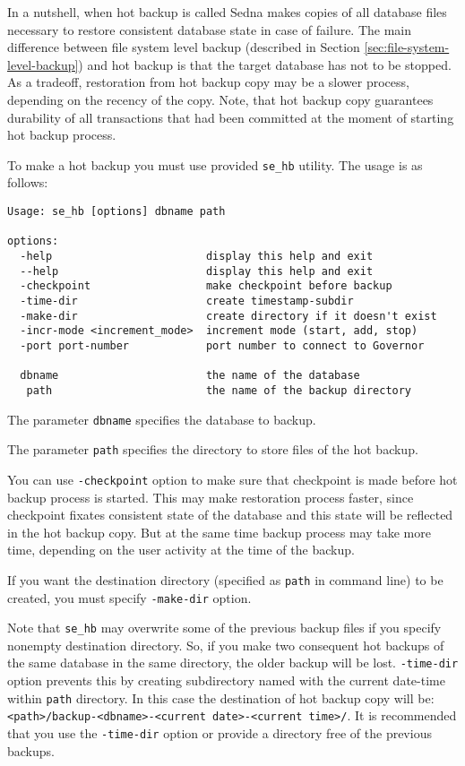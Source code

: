 \documentclass[a4paper,12pt]{article}
\begin{document}
In a nutshell, when hot backup is called Sedna makes copies of all database
files necessary to restore consistent database state in case of failure. The
main difference between file system level backup (described in Section
\ref{sec:file-system-level-backup}) and hot backup is that the target database
has not to be stopped. As a tradeoff, restoration from hot backup copy may be a
slower process, depending on the recency of the copy. Note, that hot backup copy
guarantees durability of all transactions that had been committed at the moment
of starting hot backup process.

To make a hot backup you must use provided \verb!se_hb! utility. The usage is as
follows:

\small{
\begin{verbatim}
Usage: se_hb [options] dbname path

options:
  -help                        display this help and exit
  --help                       display this help and exit
  -checkpoint                  make checkpoint before backup
  -time-dir                    create timestamp-subdir
  -make-dir                    create directory if it doesn't exist
  -incr-mode <increment_mode>  increment mode (start, add, stop)
  -port port-number            port number to connect to Governor
   
  dbname                       the name of the database
   path                        the name of the backup directory
\end{verbatim}}

The parameter \verb!dbname! specifies the database to backup.

The parameter \verb!path! specifies the directory to store files of the hot
backup.

You can use \verb!-checkpoint! option to make sure that checkpoint is made
before hot backup process is started. This may make restoration process faster,
since checkpoint fixates consistent state of the database and this state will be
reflected in the hot backup copy. But at the same time backup process may take
more time, depending on the user activity at the time of the backup.

If you want the destination directory (specified as \verb!path! in command line)
to be created, you must specify \verb!-make-dir! option.

Note that \verb!se_hb! may overwrite some of the previous backup files if you
specify nonempty destination directory. So, if you make two consequent hot
backups of the same database in the same directory, the older backup will be
lost. \verb!-time-dir! option prevents this by creating subdirectory named with
the current date-time within \verb!path! directory. In this case the destination
of hot backup copy will be:
\verb!<path>/backup-<dbname>-<current date>-<current time>/!. 
It is recommended that you use the \verb!-time-dir! option or provide a
directory free of the previous backups.
\end{document}
